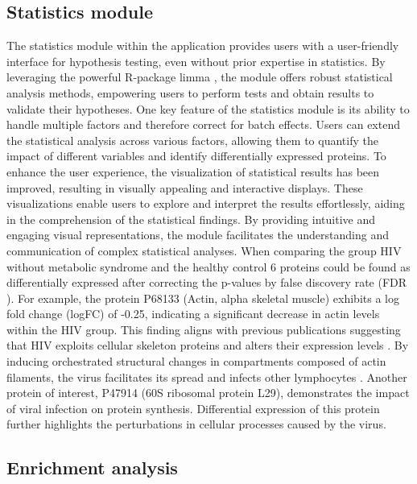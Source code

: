 \documentclass[
  11pt,
]{article}
\begin{document}
\hypertarget{statistics-module}{%
\subsection{Statistics module}\label{statistics-module}}

The statistics module within the application provides users with a user-friendly interface for hypothesis testing, even without prior expertise in statistics. By leveraging the powerful R-package limma \citep{Ritchie2015}, the module offers robust statistical analysis methods, empowering users to perform tests and obtain results to validate their hypotheses. One key feature of the statistics module is its ability to handle multiple factors and therefore correct for batch effects. Users can extend the statistical analysis across various factors, allowing them to quantify the impact of different variables and identify differentially expressed proteins. To enhance the user experience, the visualization of statistical results has been improved, resulting in visually appealing and interactive displays. These visualizations enable users to explore and interpret the results effortlessly, aiding in the comprehension of the statistical findings. By providing intuitive and engaging visual representations, the module facilitates the understanding and communication of complex statistical analyses.
When comparing the group HIV without metabolic syndrome and the healthy control 6 proteins could be found as differentially expressed after correcting the p-values by false discovery rate (FDR \citep{Benjamini1995}).
For example, the protein P68133 (Actin, alpha skeletal muscle) exhibits a log fold change (logFC) of -0.25, indicating a significant decrease in actin levels within the HIV group. This finding aligns with previous publications suggesting that HIV exploits cellular skeleton proteins and alters their expression levels \citep{Turville2018}. By inducing orchestrated structural changes in compartments composed of actin filaments, the virus facilitates its spread and infects other lymphocytes \citep{Rodrigues2022}.
Another protein of interest, P47914 (60S ribosomal protein L29), demonstrates the impact of viral infection on protein synthesis. Differential expression of this protein further highlights the perturbations in cellular processes caused by the virus.

\hypertarget{enrichment-analysis}{%
\subsection{Enrichment analysis}\label{enrichment-analysis}}
\end{document}
